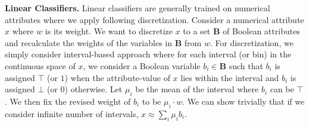 \textbf{Linear Classifiers.} Linear classifiers are generally trained on numerical attributes where we apply following discretization. Consider a numerical attribute $ x $ where $ w $ is its weight. We want to discretize $ x $ to a set $ \mathbf{B} $ of Boolean attributes and recalculate the weights of the variables in $ \mathbf{B} $ from $ w $. For discretization, we simply consider interval-based approach where for each interval (or bin) in the continuous space of $ x $, we consider a Boolean variable $ b_i \in \mathbf{B} $ such that $ b_i $ is assigned $ \top $ (or $ 1 $) when the attribute-value of $ x $ lies within the interval and $ b_i $ is assigned $ \bot $ (or $ 0 $) otherwise. Let $ \mu_i $ be the mean of the interval where  $ b_i $ can be $ \top $. We then fix the revised weight of $ b_i $ to be $ \mu_i\cdot w $. We can show trivially that if we consider infinite number of intervals, $ x \approx \sum_i \mu_ib_i $. 



